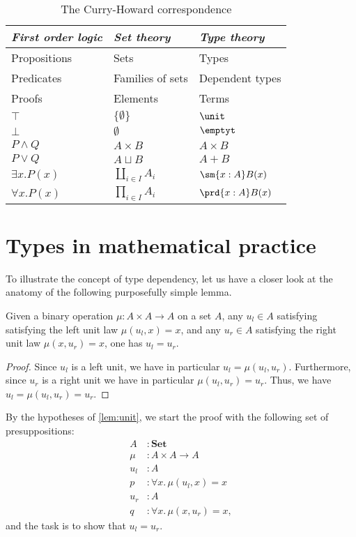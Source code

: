 \begin{table}\label{table:ch}
\caption{The Curry-Howard correspondence}
\begin{center}
\begin{tabular}{lll}
\toprule
\emph{First order logic} & \emph{Set theory} & \emph{Type theory}\\
\midrule
Propositions & Sets & Types\\
Predicates & Families of sets & Dependent types\\
Proofs & Elements & Terms \\
$\top$ & $\{\emptyset\}$ & $\unit$\\
$\bot$ & $\emptyset$ & $\emptyt$ \\
$P \land Q$ & $A \times B$ & $A \times B$ \\
$P \vee Q$ & $A \sqcup B$ & $A + B$ \\
$\exists x.P(x)$ & $\coprod_{i\in I}A_i$ & $\sm{x:A}B(x)$ \\
$\forall x.P(x)$ & $\prod_{i\in I}A_i$ & $\prd{x:A}B(x)$\\
\bottomrule
\end{tabular}
\end{center}
\end{table}

\section{Types in mathematical practice}


To illustrate the concept of type dependency, let us have a closer look at the anatomy of the following purposefully simple lemma.

\begin{lem}\label{lem:unit}
Given a binary operation $\mu:A\times A\to A$ on a set $A$, any $u_l\in A$ satisfying satisfying the left unit law $\mu(u_l,x)=x$, and any $u_r\in A$ satisfying the right unit law $\mu(x,u_r)=x$, one has $u_l=u_r$. 
\end{lem}

\begin{proof}
Since $u_l$ is a left unit, we have in particular $u_l=\mu(u_l,u_r)$. Furthermore, since $u_r$ is a right unit we have in particular $\mu(u_l,u_r)=u_r$. Thus, we have $u_l=\mu(u_l,u_r)=u_r$. 
\end{proof}

\begin{samepage}
By the hypotheses of \cref{lem:unit}, we start the proof with the following set of presuppositions:
\begin{align*}
A & : \mathbf{Set} \\
\mu & : A\times A\to A \\
u_l & : A \\
p & : \forall x.\,\mu(u_l,x)=x\\
u_r & : A \\
q & : \forall x.\,\mu(x,u_r)=x,
\end{align*}
and the task is to show that $u_l=u_r$.
\end{samepage}

